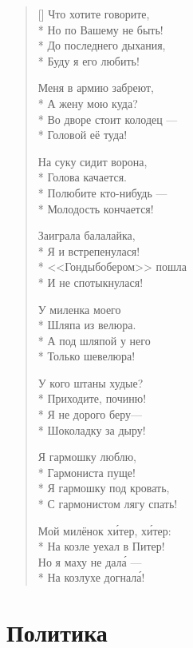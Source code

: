 \documentclass[a4paper,oneside,14pt]{scrbook}
\begin{document}
    \settowidth{\versewidth}{Что хотите говорите}
    \begin{verse}[\versewidth]
        Что хотите говорите,\\*
        Но по Вашему не быть!\\*
        До последнего дыхания,\\*
        Буду я его любить!
        
        Меня в армию забреют,\\*
        А жену мою куда?\\*
        Во дворе стоит колодец --- \\*
        Головой её туда!
        
        На суку сидит ворона,\\*
        Голова качается.\\*
        Полюбите кто-нибудь ---\\*
        Молодость кончается!
        
        Заиграла балалайка,\\*
        Я и встрепенулася!\\*
        <<Гондыбобером>> пошла\\*
        И не спотыкнулася!
        
        У миленка моего\\*
        Шляпа из велюра.\\*
        А под шляпой у него\\*
        Только шевелюра!
        
        У кого штаны худые?\\*
        Приходите, починю!\\*
        Я не дорого беру---\\*
        Шоколадку за дыру!
        
        Я гармошку люблю,\\*
        Гармониста пуще!\\*
        Я гармошку под кровать,\\*
        С гармонистом лягу спать!
        
        Мой милёнок х\'{и}тер, х\'{и}тер:\\*
        На козле уехал в Питер!\\
        Но я маху не дал\'{а} ---\\*
        На козлухе догнал\'{а}!
    \end{verse}    

    
    \section{Политика}
    
\end{document}
